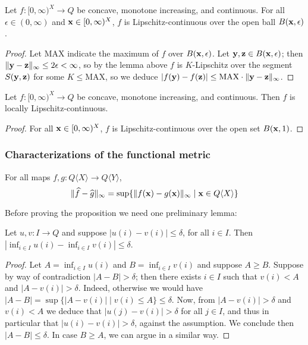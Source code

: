 \begin{proposition}
Let $f: [0,\infty)^{X}\to Q$ be concave, monotone increasing, and continuous.  
For all $\epsilon \in (0,\infty)$ and $\mathbf{x}\in [0,\infty)^{X}$, $f$ is Lipschitz-continuous over the open ball $B(\mathbf{x}, \epsilon)$.
\end{proposition}
\begin{proof}
Let $\mathrm{MAX}$ indicate the maximum of $f$ over $B(\mathbf{x}, \epsilon)$. 
Let $\mathbf{y}, \mathbf{z}\in B(\mathbf{x}, \epsilon)$; then $\|\mathbf{y}-\mathbf{z}\|_{\infty}\leq 2\epsilon < \infty$, so by the lemma above $f$ is $K$-Lipschitz over the segment $S(\mathbf{y}, \mathbf{z})$ for some $K\leq \mathrm{MAX}$, so we deduce $|f(\mathbf{y})-f(\mathbf{z})|\leq \mathrm{MAX}\cdot \|\mathbf{y}-\mathbf{z}\|_{\infty}$.
\end{proof}

\begin{theorem}
Let $f: [0,\infty)^{X}\to Q$ be concave, monotone increasing, and continuous.  
Then $f$ is locally Lipschitz-continuous.
\end{theorem}
\begin{proof}
For all $\mathbf{x}\in [0,\infty)^{X}$, $f$ is Lipschitz-continuous over the open set $B(\mathbf{x}, 1)$.
\end{proof}



\subsubsection{Characterizations of the functional metric }



  \begin{proposition}\label{prop:functionalmetric}
For all maps $f,g: Q\langle X\rangle\to Q\langle Y\rangle$,  
$$
  \|\widehat f- \widehat g\|_{\infty}=
  \sup\{\|f(\mathbf{x})- g(\mathbf{x})\|_{\infty} \mid \mathbf{x}\in Q\langle X\rangle\}
$$

\end{proposition}
  
Before proving the proposition we need one preliminary lemma:
  
\begin{lemma}
Let $u,v: I\to Q$ and suppose $|u(i)-v(i)|\leq \delta$, for all $i\in I$.
Then $|\inf_{i\in I}u(i)- \inf_{i\in I}v(i)|\leq \delta$. 
\end{lemma}
\begin{proof}
Let $A=\inf_{i\in I}u(i)$ and $B=\inf_{i\in I}v(i)$ and suppose $A\geq B$. 
Suppose by way of contradiction $|A-B|> \delta$; then there exists $i\in I$ such that 
$v(i)<A$ and $|A-v(i)|> \delta$. Indeed, otherwise we would have $|A-B|= \sup\{ |A-v(i)|\mid v(i)\leq A\}\leq \delta$. 
Now, from $|A-v(i)|> \delta$ and $v(i)< A$ we deduce that $|u(j)-v(i)|> \delta$ for all $j\in I$, and thus in particular that $|u(i)-v(i)|>\delta$, against the assumption. We conclude then $|A-B| \leq \delta$.
In case $B\geq A$, we can argue in a similar way. 
\end{proof}

